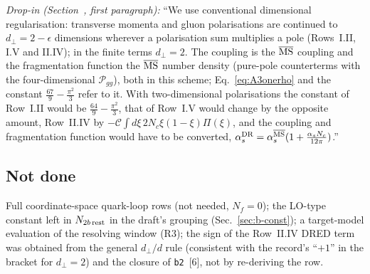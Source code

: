 \noindent\emph{Drop-in (Section~, first paragraph):} ``We use conventional dimensional regularisation: transverse momenta and gluon polarisations are continued to $d_\perp=2-\epsilon$ dimensions wherever a polarisation sum multiplies a pole (Rows~I.II, I.V and II.IV); in the finite terms $d_\perp=2$. The coupling is the $\overline{\rm MS}$ coupling and the fragmentation function the $\overline{\rm MS}$ number density (pure-pole counterterms with the four-dimensional $\mathcal P_{gg}$), both in this scheme; Eq.~\eqref{eq:A3onerho} and the constant $\frac{67}{9}-\frac{\pi^2}{3}$ refer to it. With two-dimensional polarisations the constant of Row~I.II would be $\frac{64}{9}-\frac{\pi^2}{3}$, that of Row~I.V would change by the opposite amount, Row~II.IV by $-\mathcal C\int d\xi\,2N_c\xi(1-\xi)\Pi(\xi)$, and the coupling and fragmentation function would have to be converted, $\alpha_s^{\rm DR}=\alpha_s^{\overline{\rm MS}}(1+\frac{\alpha_sN_c}{12\pi})$.''

\subsection{Not done}
Full coordinate-space quark-loop rows (not needed, $N_f=0$); the LO-type constant left in $N_{2b\,\rm rest}$ in the draft's grouping (Sec.~\ref{sec:b-const}); a target-model evaluation of the resolving window (R3); the sign of the Row~II.IV DRED term was obtained from the general $d_\perp/d$ rule (consistent with the record's ``$+1$'' in the bracket for $d_\perp=2$) and the closure of \texttt{b2}~[6], not by re-deriving the row.
